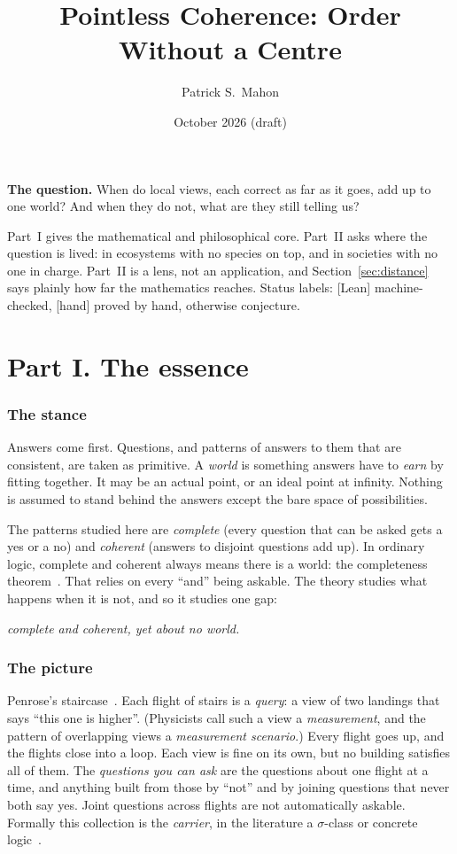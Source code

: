\documentclass[11pt]{article}
\title{Pointless Coherence: Order Without a Centre}
\author{Patrick S.\ Mahon}
\date{October 2026 \quad (draft)}
\newcommand{\st}[1]{\textsf{\small[#1]}}
\begin{document}
\maketitle

\begin{mdframed}[backgroundcolor=black!4,linewidth=0.4pt]
\textbf{The question.} When do local views, each correct as far as it goes, add
up to one world? And when they do not, what are they still telling us?

\smallskip
Part~I gives the mathematical and philosophical core. Part~II asks where the
question is lived: in ecosystems with no species on top, and in societies with
no one in charge. Part~II is a lens, not an application, and
Section~\ref{sec:distance} says plainly how far the mathematics reaches.
Status labels: \st{Lean} machine-checked, \st{hand} proved by hand, otherwise
conjecture.
\end{mdframed}

\part*{Part I. The essence}

\section{The stance}
Answers come first. Questions, and patterns of answers to them that are
consistent, are taken as primitive. A \emph{world} is something answers have to
\emph{earn} by fitting together. It may be an actual point, or an ideal point at
infinity. Nothing is assumed to stand behind the answers except the bare space of
possibilities.

The patterns studied here are \emph{complete} (every question that can be asked
gets a yes or a no) and \emph{coherent} (answers to disjoint questions add up).
In ordinary logic, complete and coherent always means there is a world: the
completeness theorem~\cite{godel1930}. That relies on every ``and'' being
askable. The theory studies what happens when it is not, and so it studies one
gap:
\begin{center}\emph{complete and coherent, yet about no world.}\end{center}

\section{The picture}
Penrose's staircase~\cite{penrose1991}. Each flight of stairs is a
\emph{query}: a view of two landings that says ``this one is higher''. (Physicists
call such a view a \emph{measurement}, and the pattern of overlapping views a
\emph{measurement scenario}.) Every flight goes up,
and the flights close into a loop. Each view is fine on its own, but no building
satisfies all of them. The \emph{questions you can ask} are the questions about
one flight at a time, and anything built from those by ``not'' and by joining
questions that never both say yes. Joint questions across flights are not
automatically askable. Formally this collection is the \emph{carrier}, in the
literature a $\sigma$-class or concrete logic~\cite{navaraptak1983}.
\end{document}
